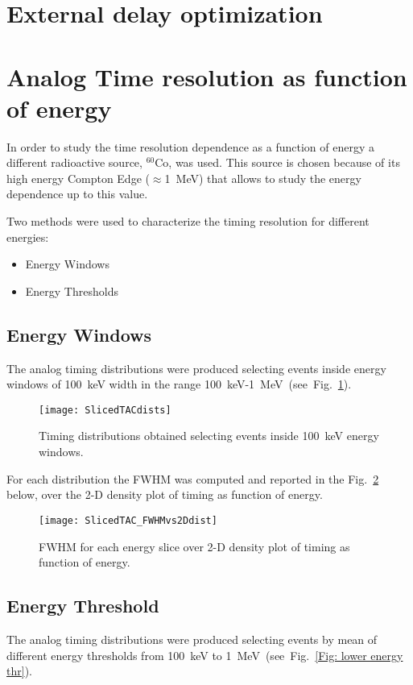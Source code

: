 \section*{External delay optimization}
\blankpage
\section*{Analog Time resolution as function of energy}
In order to study the time resolution dependence as a function of energy a different radioactive source, $^{60}$Co, was used. This source is chosen because of its high energy Compton Edge ($\approx$1~MeV) that allows to study the energy dependence up to this value. 

Two methods were used to characterize the  timing resolution for different energies: 
\begin{itemize}
	\item Energy Windows
	\item Energy Thresholds
\end{itemize} 

\subsection*{Energy Windows}
 The analog timing distributions were produced selecting events inside energy windows of 100~keV width in the range 100~keV-1~MeV~(see~Fig.~\ref{Fig:Energy_slice}). 
\begin{figure}[h!]
	\centering
	\texttt{[image: SlicedTACdists]}
	\caption{Timing distributions obtained selecting events inside 100~keV energy windows.}
	\label{Fig:Energy_slice}
\end{figure}

For each distribution the FWHM was computed and reported in the Fig.~\ref{fig: energy windows analog} below, over the 2-D density plot of timing as function of energy.

\begin{figure}[h!]
	\centering
	\texttt{[image: SlicedTAC\_FWHMvs2Ddist]}
	\caption{FWHM for each energy slice over 2-D density plot of timing as function of energy. }
	\label{fig: energy windows analog}
\end{figure}
\newpage

\subsection*{Energy Threshold}
 The analog timing distributions were produced selecting events by mean of different energy thresholds from 100~keV to 1~MeV~(see~Fig.~\ref{Fig: lower energy thr}). 

